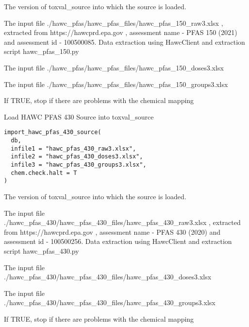 \documentclass[letterpaper]{book}
\begin{document}
\begin{Arguments}
\begin{ldescription}
\item[\code{db}] The version of toxval\_source into which the source is loaded.

\item[\code{infile1}] The input file ./hawc\_pfas/hawc\_pfas\_files/hawc\_pfas\_150\_raw3.xlsx , extracted
from https://hawcprd.epa.gov , assessment name - PFAS 150 (2021) and assessment id - 100500085.
Data extraction using HawcClient and extraction script hawc\_pfas\_150.py

\item[\code{infile2}] The input file ./hawc\_pfas/hawc\_pfas\_files/hawc\_pfas\_150\_doses3.xlsx

\item[\code{infile3}] The input file ./hawc\_pfas/hawc\_pfas\_files/hawc\_pfas\_150\_groups3.xlsx

\item[\code{chem.check.halt}] If TRUE, stop if there are problems with the chemical mapping
\end{ldescription}
\end{Arguments}
%
\begin{Description}\relax
Load HAWC PFAS 430 Source into toxval\_source
\end{Description}
%
\begin{Usage}
\begin{verbatim}
import_hawc_pfas_430_source(
  db,
  infile1 = "hawc_pfas_430_raw3.xlsx",
  infile2 = "hawc_pfas_430_doses3.xlsx",
  infile3 = "hawc_pfas_430_groups3.xlsx",
  chem.check.halt = T
)
\end{verbatim}
\end{Usage}
%
\begin{Arguments}
\begin{ldescription}
\item[\code{db}] The version of toxval\_source into which the source is loaded.

\item[\code{infile1}] The input file ./hawc\_pfas\_430/hawc\_pfas\_430\_files/hawc\_pfas\_430\_raw3.xlsx , extracted
from https://hawcprd.epa.gov , assessment name - PFAS 430 (2020) and assessment id - 100500256.
Data extraction using HawcClient and extraction script hawc\_pfas\_430.py

\item[\code{infile2}] The input file ./hawc\_pfas\_430/hawc\_pfas\_430\_files/hawc\_pfas\_430\_doses3.xlsx

\item[\code{infile3}] The input file ./hawc\_pfas\_430/hawc\_pfas\_430\_files/hawc\_pfas\_430\_groups3.xlsx

\item[\code{chem.check.halt}] If TRUE, stop if there are problems with the chemical mapping
\end{ldescription}
\end{Arguments}
\end{document}
